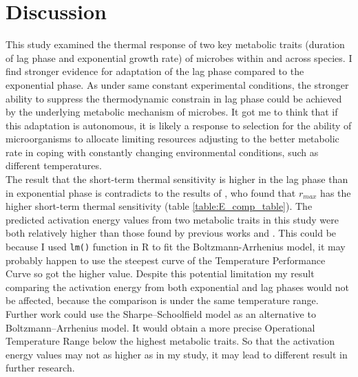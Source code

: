 \documentclass[a4paper]{article}
\begin{document}
\section{Discussion}

This study examined the thermal response of two key metabolic traits (duration of lag phase and exponential growth rate) of microbes within and across species. I find stronger evidence for adaptation of the lag phase compared to the exponential phase. As under same constant experimental conditions, the stronger ability to suppress the thermodynamic constrain in lag phase could be achieved by the underlying metabolic mechanism of microbes. It got me to think that if this adaptation is autonomous, it is likely a response to selection for the ability of microorganisms to allocate limiting resources adjusting to the better metabolic rate in coping with constantly changing environmental conditions, such as different temperatures. \\


The result that the short-term thermal sensitivity is higher in the lag phase than in exponential phase is contradicts to the results of \citealt{de2018determination},  who found that $r_{max}$ has the higher short-term thermal sensitivity (table \ref{table:E_comp_table}). The predicted activation energy values from two metabolic traits in this study were both relatively higher than those found by previous works \citealt{de2018determination} and \citealt{smith2019community}. This could be because I used \texttt{lm()} function in R to fit the Boltzmann-Arrhenius model, it may probably happen to use the steepest curve of the Temperature Performance Curve so got the higher value. Despite this potential limitation my result comparing the activation energy from both exponential and lag phases would not be affected, because the comparison is under the same temperature range. Further work could use the Sharpe–Schoolfield model \citep{shi2010comparison} as an alternative to Boltzmann–Arrhenius model. It would obtain a more precise Operational Temperature Range below the highest metabolic traits. So that the activation energy values may not as higher as in my study, it may lead to different result in further research. \\
\begin{center}

\end{center}
\end{document}
